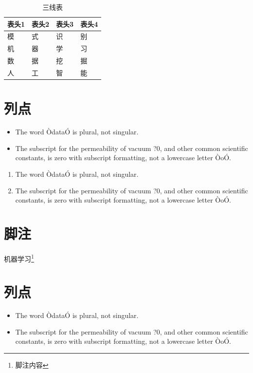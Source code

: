 \documentclass[letterpaper, 10pt, conference, twoside]{ieeeconf}
\begin{document}
\begin{table}[htbp]
  \centering
 \caption{三线表}
 \label{tab:table2}
 \begin{tabular}{llll}
  \toprule
  表头1 & 表头2 & 表头3& 表头4\\
  \midrule
    模&式&识&别\\
    机&器&学&习\\
    数&据&挖&掘\\
    人&工&智&能\\
  \bottomrule
 \end{tabular}
\end{table}




\section{列点}

\begin{itemize}
\item The word ÒdataÓ is plural, not singular.
\item The subscript for the permeability of vacuum ?0, and other common scientific constants, is zero with subscript formatting, not a lowercase letter ÒoÓ.
\end{itemize}

\begin{enumerate}
\item The word ÒdataÓ is plural, not singular.
\item The subscript for the permeability of vacuum ?0, and other common scientific constants, is zero with subscript formatting, not a lowercase letter ÒoÓ.
\end{enumerate}


\section{脚注}
机器学习\footnote{脚注内容}

\section{列点}

\begin{itemize}
\item The word ÒdataÓ is plural, not singular.
\item The subscript for the permeability of vacuum ?0, and other common scientific constants, is zero with subscript formatting, not a lowercase letter ÒoÓ.
\end{itemize}
\end{document}
